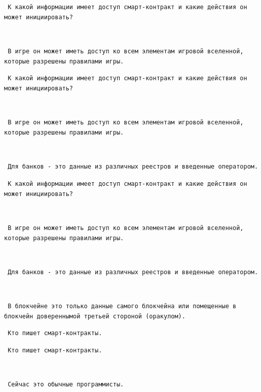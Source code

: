 \documentclass[11pt,handout,pdf,hyperref={unicode}]{beamer}
\begin{document}
\begin{frame}[fragile]

\texttt{ К какой информации имеет доступ смарт-контракт и какие действия он может инициировать? }

\texttt{ }

\texttt{ В игре он может иметь доступ ко всем элементам игровой вселенной, которые разрешены правилами игры. }

\end{frame}

\begin{frame}[fragile]

\texttt{ К какой информации имеет доступ смарт-контракт и какие действия он может инициировать? }

\texttt{ }

\texttt{ В игре он может иметь доступ ко всем элементам игровой вселенной, которые разрешены правилами игры. }

\texttt{ }

\texttt{ Для банков - это данные из различных реестров и введенные оператором. }

\end{frame}

\begin{frame}[fragile]

\texttt{ К какой информации имеет доступ смарт-контракт и какие действия он может инициировать? }

\texttt{ }

\texttt{ В игре он может иметь доступ ко всем элементам игровой вселенной, которые разрешены правилами игры. }

\texttt{ }

\texttt{ Для банков - это данные из различных реестров и введенные оператором. }

\texttt{ }

\texttt{ В блокчейне это только данные самого блокчейна или помещенные в блокчейн довереннымой третьей стороной (оракулом). }

\end{frame}

\begin{frame}[fragile]

\texttt{ Кто пишет смарт-контракты. }

\end{frame}

\begin{frame}[fragile]

\texttt{ Кто пишет смарт-контракты. }

\texttt{ }

\texttt{ Сейчас это обычные программисты. }

\end{frame}
\end{document}
